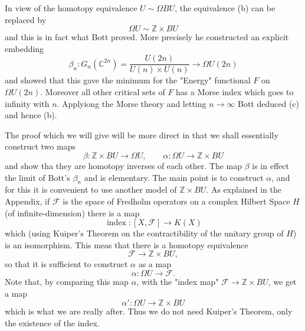 \documentclass[leqno]{book}
\numberwithin{equation}{section}
\theoremstyle{definition}
\begin{document}
            In view of the homotopy equivalence $U\sim \Omega BU$, the equivalence (b) can be replaced by
            \begin{equation*}
              \tag{c}
              \Omega U \sim \mathbb{Z}\times BU
            \end{equation*}
            and this is in fact what Bott proved. More precisely he constructed an explicit embedding
            \begin{equation*}
              \beta_{n}:G_{n}(\mathbb{C}^{2n})=\frac{U(2n)}{U(n)\times U(n)}\to \Omega U(2n)
            \end{equation*}
            and showed that this gave the minimum for the "Energy" functional $F$ on $\Omega U(2n)$. Moreover all other critical sets of $F$ has a Morse index which goes to infinity with $n$. Applyiong the Morse theory and letting $n\to \infty$ Bott deduced (c) and hence (b).

            The proof which we will give will be more direct in that we shall essentially construct two maps
            \begin{equation*}
              \beta:\mathbb{Z}\times BU\to \Omega U, \qquad \alpha:\Omega U\to \mathbb{Z}\times BU
            \end{equation*}
            and show tha they are homotopy inverses of each other. The map $\beta$ is in effect the limit of Bott's $\beta _{n}$ and is elementary. The main point is to construct $\alpha$, and for this it is convenient to use another model of $\mathbb{Z}\times BU$. As explained in the Appendix, if $\mathcal{F}$ is the space of Fredholm operators on a complex Hilbert Space $H$ (of infinite-dimension) there is a map
            \begin{equation*}
              \operatorname{index}: [X, \mathcal{F}]\to K(X)
            \end{equation*}
            which (using Kuiper's Theorem on the contractibility of the unitary group of $H$) is an isomorphism. This meas that there is a homotopy equivalence
            \begin{equation*}
              \mathcal{F}\to \mathbb{Z}\times BU,
            \end{equation*}
            so that it is sufficient to construct $\alpha$ as a map
            \begin{equation*}
              \alpha:\Omega U\to \mathcal{F}.
            \end{equation*}
            Note that, by comparing this map $\alpha$, with the "index map" $\mathcal{F}\to \mathbb{Z}\times BU$, we get a map
            \begin{equation*}
              \alpha':\Omega U\to \mathbb{Z}\times BU
            \end{equation*}
            which is what we are really after. Thus we do not need Kuiper's Theorem, only the existence of the index.
\end{document}
